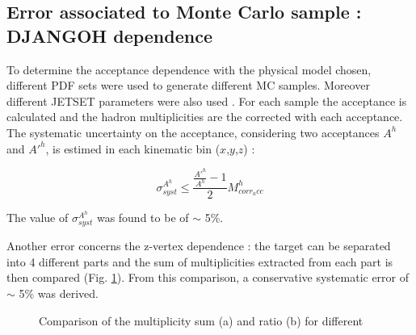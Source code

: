 
\subsection{Error associated to Monte Carlo sample : DJANGOH dependence}

To determine the acceptance dependence with the physical model chosen, different PDF sets were used to generate different MC samples. Moreover different JETSET parameters were also used \cite{}. For each sample the acceptance is calculated and the hadron multiplicities are the corrected with each acceptance. The systematic uncertainty on the acceptance, considering two acceptances $A^h$ and $A'^h$, is estimed in each kinematic bin ($x$,$y$,$z$) :

\begin{equation}
  \sigma^{A^h}_{syst} \leq \frac{\frac{A'^h}{A^h}-1}{2}M^h_{corr_acc}
\end{equation}

The value of $\sigma^{A^h}_{syst}$ was found to be of $\sim$ 5\%.

Another error concerns the z-vertex dependence : the target can be separated into 4 different parts and the sum of multiplicities extracted from each part is then compared (Fig. \ref{pic:Zvertexsum}). From this comparison, a conservative systematic error of $\sim$ 5\% was derived.

\begin{figure}[!h]
  \centering
	\caption{Comparison of the multiplicity sum (a) and ratio (b) for different }
	\label{pic:Zvertexsum}
\end{figure}

